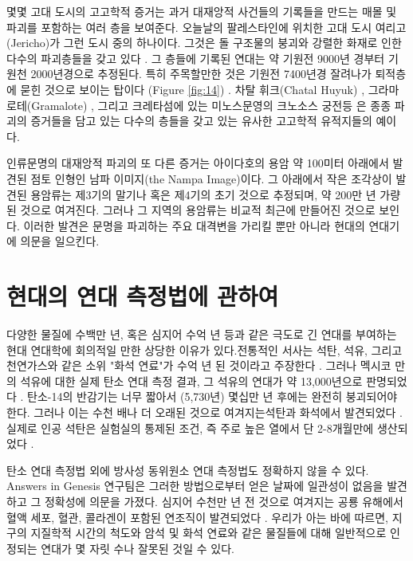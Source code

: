 \documentclass[10pt,twocolumn,letterpaper]{article}
\begin{document}
몇몇 고대 도시의 고고학적 증거는 과거 대재앙적 사건들의 기록들을 만드는 매몰 및 파괴를 포함하는 여러 층을 보여준다. 오늘날의  팔레스타인에 위치한 고대 도시 여리고(Jericho)가 그런 도시 중의 하나이다. 그것은 돌 구조물의 붕괴와 강렬한 화재로 인한 다수의 파괴층들을 갖고 있다 \cite{96,97}. 그 층들에 기록된 연대는 약 기원전 9000년 경부터 기원천 2000년경으로 추정된다. 특히 주목할만한 것은 기원전 7400년경 잘려나가 퇴적층에 묻힌 것으로 보이는 탑이다 (Figure \ref{fig:14}) \cite{95}. 차탈 휘크(Chatal Huyuk) \cite{99}, 그라마로테(Gramalote) \cite{98}, 그리고 크레타섬에 있는 미노스문영의 크노소스 궁전등 \cite{100,101}은 종종 파괴의 증거들을 담고 있는 다수의 층들을 갖고 있는 유사한 고고학적 유적지들의 예이다. 

인류문명의 대재앙적 파괴의 또 다른 증거는 아이다호의 용암 약 100미터 아래에서 발견된 점토 인형인 남파 이미지(the Nampa Image)이다\cite{102,103}. 그 아래에서 작은 조각상이 발견된 용암류는 제3기의 말기나 혹은 제4기의 초기 것으로 추정되며, 약 200만 년 가량 된 것으로 여겨진다. 그러나 그 지역의 용암류는 비교적 최근에 만들어진 것으로 보인다. 이러한 발견은 문명을 파괴하는 주요 대격변을 가리킬 뿐만 아니라 현대의 연대기에 의문을 일으킨다.

\section{현대의 연대 측정법에 관하여}

다양한 물질에  수백만 년, 혹은 심지어 수억 년 등과 같은 극도로 긴 연대를  부여하는 현대 연대학에 회의적일 만한 상당한 이유가 있다.전통적인 서사는 석탄, 석유, 그리고 천연가스와 같은 소위 "화석 연료"가 수억 년 된 것이라고 주장한다 \cite{104}. 그러나 멕시코 만의 석유에 대한 실제 탄소 연대 측정 결과, 그 석유의 연대가 약 13,000년으로 판명되었다 \cite{105}. 탄소-14의 반감기는 너무 짧아서 (5,730년) 몇십만 년 후에는 완전히 붕괴되어야 한다. 그러나 이는 수천 배나 더 오래된 것으로 여겨지는석탄과 화석에서 발견되었다 \cite{106}. 실제로 인공 석탄은 실험실의 통제된 조건, 즉 주로 높은 열에서 단 2-8개월만에 생산되었다 \cite{107}.

탄소 연대 측정법 외에  방사성 동위원소 연대 측정법도 정확하지 않을 수 있다. Answers in Genesis 연구팀은 그러한 방법으로부터 얻은 날짜에 일관성이 없음을 발견하고 그 정확성에 의문을 가졌다\cite{108}. 심지어 수천만 년 전 것으로 여겨지는 공룡 유해에서 혈액 세포, 혈관, 콜라겐이 포함된 연조직이 발견되었다 \cite{109,110}. 우리가 아는 바에 따르면, 지구의 지질학적 시간의 척도와 암석 및 화석 연료와 같은 물질들에 대해 일반적으로 인정되는 연대가 몇 자릿 수나 잘못된 것일 수 있다.
\end{document}
